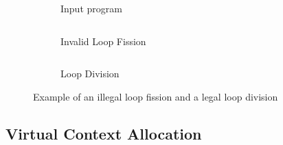 \begin{figure}
\centering
\begin{subfigure}[b]{0.28\textwidth}
\inputminted{python}{code/loopexp2.py}
\caption{Input program}
\end{subfigure}
\hfill
\begin{subfigure}[b]{0.32\textwidth}
\inputminted{python}{code/loopexp2fission.py}
\caption{Invalid Loop Fission}
\end{subfigure}
\hfill
\begin{subfigure}[b]{0.31\textwidth}
\inputminted{python}{code/loopexp2division.py}
\caption{Loop Division}
\end{subfigure}
\caption[Example of an illegal loop fission and a legal loop division]{
Example of an illegal loop fission and a legal loop division
}
\label{fig:loopexp2}
\end{figure}

\subsection{Virtual Context Allocation} 

